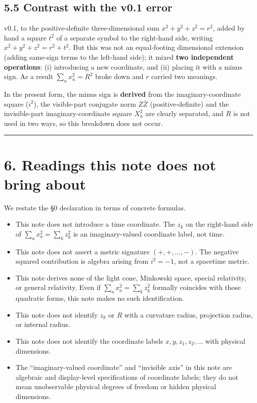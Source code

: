 \documentclass[11pt,a4paper]{article}
\newcounter{none}
\providecommand{\tightlist}{\setlength{\itemsep}{0pt}\setlength{\parskip}{0pt}}
\begin{document}
\subsection{5.5 Contrast with the v0.1
error}\label{contrast-with-the-v0.1-error}

v0.1, to the positive-definite three-dimensional sum
\(x^2+y^2+z^2=r^2\), added by hand a square \(t^2\) of a separate symbol
to the right-hand side, writing \(x^2+y^2+z^2=r^2+t^2\). But this was
not an equal-footing dimensional extension (adding same-sign terms to
the left-hand side); it mixed \textbf{two independent operations}: (i)
introducing a new coordinate, and (ii) placing it with a minus sign. As
a result \(\sum_n x_n^2=R^2\) broke down and \(r\) carried two meanings.

In the present form, the minus sign is \textbf{derived} from the
imaginary-coordinate square (\(i^2\)), the visible-part conjugate norm
\(Z\bar Z\) (positive-definite) and the invisible-part
imaginary-coordinate square \(X_h^2\) are clearly separated, and \(R\)
is not used in two ways, so this breakdown does not occur.

\begin{center}\rule{0.5\linewidth}{0.5pt}\end{center}

\section{6. Readings this note does not bring
about}\label{readings-this-note-does-not-bring-about}

We restate the §0 declaration in terms of concrete formulas.

\begin{itemize}
\tightlist
\item
  This note does not introduce a time coordinate. The \(z_k\) on the
  right-hand side of \(\sum_a x_a^2=\sum_k z_k^2\) is an
  imaginary-valued coordinate label, not time.
\item
  This note does not assert a metric signature \((+,+,\dots,-)\). The
  negative squared contribution is algebra arising from \(i^2=-1\), not
  a spacetime metric.
\item
  This note derives none of the light cone, Minkowski space, special
  relativity, or general relativity. Even if
  \(\sum_a x_a^2=\sum_k z_k^2\) formally coincides with those quadratic
  forms, this note makes no such identification.
\item
  This note does not identify \(z_k\) or \(R\) with a curvature radius,
  projection radius, or internal radius.
\item
  This note does not identify the coordinate labels
  \(x,y,z_1,z_2,\dots\) with physical dimensions.
\item
  The ``imaginary-valued coordinate'' and ``invisible axis'' in this
  note are algebraic and display-level specifications of coordinate
  labels; they do not mean unobservable physical degrees of freedom or
  hidden physical dimensions.
\end{itemize}
\end{document}
